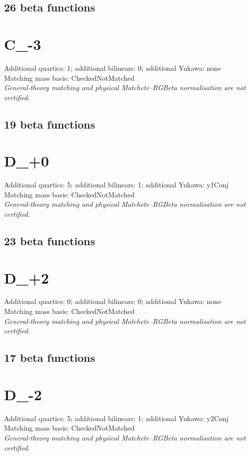 \documentclass[10pt,a4paper]{article}
\begin{document}
\subsection*{26 beta functions}

\clearpage
\section{C\_-3}
Additional quartics: 1; additional bilinears: 0; additional Yukawa: none\\
Matching mass basis: CheckedNotMatched\\
\emph{General-theory matching and physical Matchete--RGBeta normalisation are not certified.}
\subsection*{19 beta functions}

\clearpage
\section{D\_+0}
Additional quartics: 5; additional bilinears: 1; additional Yukawa: y1Conj\\
Matching mass basis: CheckedNotMatched\\
\emph{General-theory matching and physical Matchete--RGBeta normalisation are not certified.}
\subsection*{23 beta functions}

\clearpage
\section{D\_+2}
Additional quartics: 0; additional bilinears: 0; additional Yukawa: none\\
Matching mass basis: CheckedNotMatched\\
\emph{General-theory matching and physical Matchete--RGBeta normalisation are not certified.}
\subsection*{17 beta functions}

\clearpage
\section{D\_-2}
Additional quartics: 5; additional bilinears: 1; additional Yukawa: y2Conj\\
Matching mass basis: CheckedNotMatched\\
\emph{General-theory matching and physical Matchete--RGBeta normalisation are not certified.}
\end{document}
